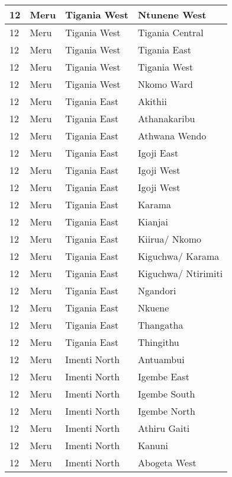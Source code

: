 \begin{table}[!ht]
\begin{tabular}{|l|l|l|l|}
        12 & Meru & Tigania West & Ntunene West \\ \hline
        12 & Meru & Tigania West & Tigania Central \\ \hline
        12 & Meru & Tigania West & Tigania East \\ \hline
        12 & Meru & Tigania West & Tigania West \\ \hline
        12 & Meru & Tigania West & Nkomo Ward \\ \hline
        12 & Meru & Tigania East & Akithii \\ \hline
        12 & Meru & Tigania East & Athanakaribu \\ \hline
        12 & Meru & Tigania East & Athwana Wendo \\ \hline
        12 & Meru & Tigania East & Igoji East \\ \hline
        12 & Meru & Tigania East & Igoji West \\ \hline
        12 & Meru & Tigania East & Igoji West \\ \hline
        12 & Meru & Tigania East & Karama \\ \hline
        12 & Meru & Tigania East & Kianjai \\ \hline
        12 & Meru & Tigania East & Kiirua/ Nkomo \\ \hline
        12 & Meru & Tigania East & Kiguchwa/ Karama \\ \hline
        12 & Meru & Tigania East & Kiguchwa/ Ntirimiti \\ \hline
        12 & Meru & Tigania East & Ngandori \\ \hline
        12 & Meru & Tigania East & Nkuene \\ \hline
        12 & Meru & Tigania East & Thangatha \\ \hline
        12 & Meru & Tigania East & Thingithu \\ \hline
        12 & Meru & Imenti North & Antuambui \\ \hline
        12 & Meru & Imenti North & Igembe East \\ \hline
        12 & Meru & Imenti North & Igembe South \\ \hline
        12 & Meru & Imenti North & Igembe North \\ \hline
        12 & Meru & Imenti North & Athiru Gaiti \\ \hline
        12 & Meru & Imenti North & Kanuni \\ \hline
        12 & Meru & Imenti North & Abogeta West \\ \hline

\end{tabular}
\end{table}
